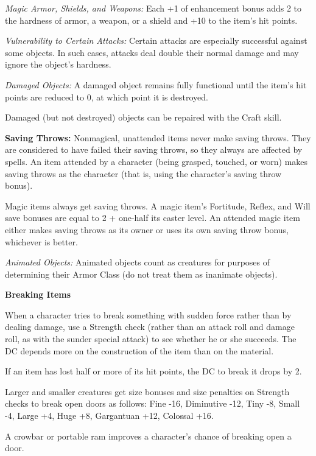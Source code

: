 \documentclass{article}
\begin{document}
\textit{Magic Armor, Shields, and Weapons: }Each +1 of enhancement bonus adds 2 
to the hardness of armor, a weapon, or a shield and +10 to the item's hit points.

\textit{Vulnerability to Certain Attacks: }Certain attacks are especially successful 
against some objects. In such cases, attacks deal double their normal damage and 
may ignore the object's hardness.

\textit{Damaged Objects: }A damaged object remains fully functional until the item's 
hit points are reduced to 0, at which point it is destroyed.

Damaged (but not destroyed) objects can be repaired with the Craft skill.

\textbf{Saving Throws: }Nonmagical, unattended items never make saving throws. 
They are considered to have failed their saving throws, so they always are affected 
by spells. An item attended by a character (being grasped, touched, or worn) makes 
saving throws as the character (that is, using the character's saving throw bonus).

Magic items always get saving throws. A magic item's Fortitude, Reflex, and Will 
save bonuses are equal to 2 + one-half its caster level. An attended magic item 
either makes saving throws as its owner or uses its own saving throw bonus, whichever 
is better.

\textit{Animated Objects: }Animated objects count as creatures for purposes of 
determining their Armor Class (do not treat them as inanimate objects).

\vspace{12pt}
\textbf{Breaking Items}

When a character tries to break something with sudden force rather than by dealing 
damage, use a Strength check (rather than an attack roll and damage roll, as with 
the sunder special attack) to see whether he or she succeeds. The DC depends more 
on the construction of the item than on the material.

If an item has lost half or more of its hit points, the DC to break it drops by 
2.

Larger and smaller creatures get size bonuses and size penalties on Strength checks 
to break open doors as follows: Fine -16, Diminutive -12, Tiny -8, Small -4, Large 
+4, Huge +8, Gargantuan +12, Colossal +16.

A crowbar or portable ram improves a character's chance of breaking open a door.
\end{document}
